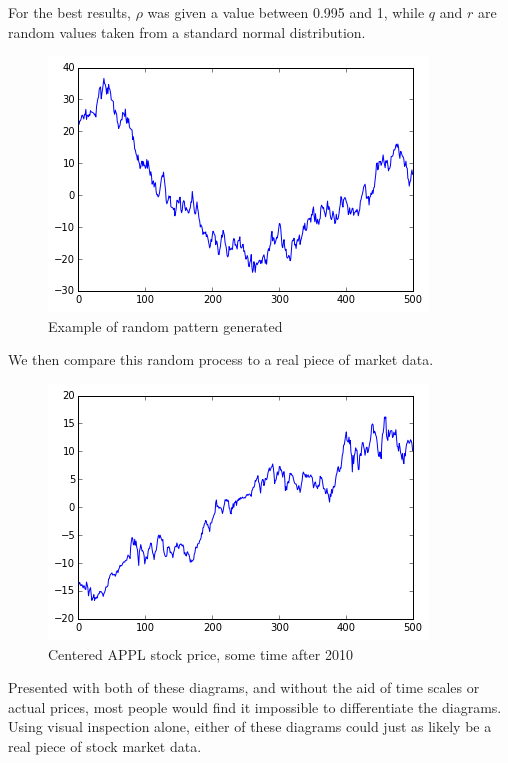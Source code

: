 \documentclass{report}
\begin{document}
For the best results, $\rho$ was given a value between 0.995 and 1, while $q$ and $r$ are random values taken from a standard normal distribution. 

\begin{figure}[H]
	\caption{Example of random pattern generated}
	\centerline{\includegraphics[width=\textwidth]{vis/random-process.png}}
	\label{fig:random-process}
\end{figure}

We then compare this random process to a real piece of market data.

\begin{figure}[H]
	\caption{Centered APPL stock price, some time after 2010}
	\centerline{\includegraphics[width=\textwidth]{vis/appl.png}}
	\label{fig:appl-process}
\end{figure}

Presented with both of these diagrams, and without the aid of time scales or actual prices, most people would find it impossible to differentiate the diagrams. Using visual inspection alone, either of these diagrams could just as likely be a real piece of stock market data.
\end{document}
